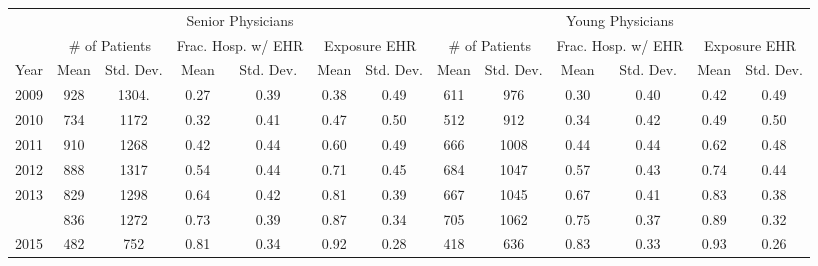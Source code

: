 
\scriptsize
\begin{tabular}[t]{lcccccccccccc}
\toprule
\multicolumn{1}{c}{ } & \multicolumn{6}{c}{Senior Physicians} & \multicolumn{6}{c}{Young Physicians} \\
\cmidrule(l{3pt}r{3pt}){2-7} \cmidrule(l{3pt}r{3pt}){8-13}
\multicolumn{1}{c}{ } & \multicolumn{2}{c}{\# of Patients} & \multicolumn{2}{c}{Frac. Hosp. w/ EHR} & \multicolumn{2}{c}{Exposure EHR} & \multicolumn{2}{c}{\# of Patients} & \multicolumn{2}{c}{Frac. Hosp. w/ EHR} & \multicolumn{2}{c}{Exposure EHR} \\
\cmidrule(l{3pt}r{3pt}){2-3} \cmidrule(l{3pt}r{3pt}){4-5} \cmidrule(l{3pt}r{3pt}){6-7} \cmidrule(l{3pt}r{3pt}){8-9} \cmidrule(l{3pt}r{3pt}){10-11} \cmidrule(l{3pt}r{3pt}){12-13}
Year & Mean & Std. Dev. & Mean & Std. Dev. & Mean & Std. Dev. & Mean & Std. Dev. & Mean & Std. Dev. & Mean & Std. Dev.\\
\midrule
2009 & 928 & 1304. & 0.27 & 0.39 & 0.38 & 0.49 & 611 & 976 & 0.30 & 0.40 & 0.42 & 0.49\\
2010 & 734 & 1172 & 0.32 & 0.41 & 0.47 & 0.50 & 512 & 912 & 0.34 & 0.42 & 0.49 & 0.50\\
2011 & 910 & 1268 & 0.42 & 0.44 & 0.60 & 0.49 & 666 & 1008 & 0.44 & 0.44 & 0.62 & 0.48\\
2012 & 888 & 1317 & 0.54 & 0.44 & 0.71 & 0.45 & 684 & 1047 & 0.57 & 0.43 & 0.74 & 0.44\\
2013 & 829 & 1298 & 0.64 & 0.42 & 0.81 & 0.39 & 667 & 1045 & 0.67 & 0.41 & 0.83 & 0.38\\
\addlinespace
2014 & 836 & 1272 & 0.73 & 0.39 & 0.87 & 0.34 & 705 & 1062 & 0.75 & 0.37 & 0.89 & 0.32\\
2015 & 482 & 752 & 0.81 & 0.34 & 0.92 & 0.28 & 418 & 636 & 0.83 & 0.33 & 0.93 & 0.26\\
\bottomrule
\end{tabular}
